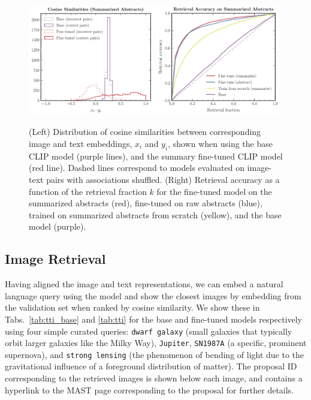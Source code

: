 \documentclass[10pt]{article} %
\begin{document}
\begin{figure}[!h]
  \includegraphics[width=0.49\textwidth]{plots/sim_val.pdf}
  \includegraphics[width=0.49\textwidth]{plots/retrieval.pdf}
  \caption{(Left) Distribution of cosine similarities between corresponding image and text embeddings, $x_i$ and $y_i$, shown when using the base CLIP model (purple lines), and the summary fine-tuned CLIP model (red line). Dashed lines correspond to models evaluated on image-text pairs with associations shuffled. (Right) Retrieval accuracy as a function of the retrieval fraction $k$ for the fine-tuned model on the summarized abstracts (red), fine-tuned on raw abstracts (blue), trained on summarized abstracts from scratch (yellow), and the base model (purple).}
  \label{fig:sim_valtrain}
  \end{figure}

\subsection{Image Retrieval}

Having aligned the image and text representations, we can embed a natural language query using the model and show the closest images by embedding from the validation set when ranked by cosine similarity.
%
We show these in Tabs.~\ref{tab:tti_base} and \ref{tab:tti} for the base and fine-tuned models respectively using four simple curated queries: \texttt{dwarf galaxy} (small galaxies that typically orbit larger galaxies like the Milky Way), \texttt{Jupiter},  \texttt{SN1987A} (a specific, prominent supernova), and \texttt{strong lensing} (the phenomenon of bending of light due to the gravitational influence of a foreground distribution of matter). The proposal ID corresponding to the retrieved images is shown below each image, and contains a hyperlink to the MAST page corresponding to the proposal for further details.
\end{document}
